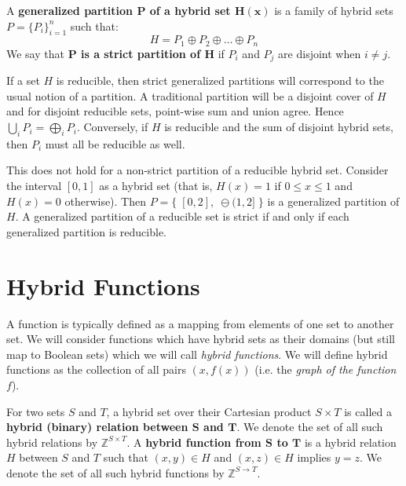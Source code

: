 \begin{definition}
	A \textbf{generalized partition $\boldsymbol{P}$ of a hybrid set $\boldsymbol{H(x)}$} is a family of hybrid sets
	${P=\{P_i \}_{i=1}^n}$ such that:
	\begin{equation}
		H = P_1 \oplus P_2 \oplus \ldots \oplus P_n
	\end{equation}
	We say that \textbf{$\boldsymbol{P}$ is a strict partition of $\boldsymbol{H}$} if 
	$P_i$ and $P_j$ are disjoint when $i \neq j$.
\end{definition}


If a set $H$ is reducible, then strict generalized partitions will correspond to the usual notion of a partition.
A traditional partition will be a disjoint cover of $H$ and for disjoint reducible sets, point-wise sum and union agree.
Hence $\bigcup_i P_i = \bigoplus_i P_i$. 
Conversely, if $H$ is reducible and the sum of disjoint hybrid sets, then $P_i$ must all be reducible as well.


This does not hold for a non-strict partition of a reducible hybrid set.
Consider the interval $[0,1]$ as a hybrid set (that is, $H(x)=1$ if $0 \leq x \leq 1$ and $H(x)=0$ otherwise).
Then $P = \big\{\; [0,2], \;\ominus (1,2] \; \big\}$ is a generalized partition of $H$. 
A generalized partition of a reducible set is strict if and only if each generalized partition is reducible.





\section{Hybrid Functions}
\label{sec:HybridFunction}


A function is typically defined as a mapping from elements of one set to another set.
We will consider functions which have hybrid sets as their domains (but still map to Boolean sets) 
which we will call \emph{hybrid functions}.
We will define hybrid functions as the collection of all pairs $(x,f(x))$ (i.e. the \emph{graph of the function} $f$).


\begin{definition}
	For two sets $S$ and $T$, a hybrid set over their Cartesian product $S \times T$ is called a 
	\textbf{hybrid (binary) relation between $\boldsymbol{S}$ and $\boldsymbol{T}$}.
	We denote the set of all such hybrid relations by $\mathbb{Z}^{S \times T}$. 
	A \textbf{hybrid function from $\boldsymbol{S}$ to $\boldsymbol{T}$} is 
	a hybrid relation $H$ between $S$ and $T$ such that $(x,y) \in H$ and $(x,z) \in H$ implies $y=z$.
	We denote the set of all such hybrid functions by $\mathbb{Z}^{S \to T}$.
\end{definition}


